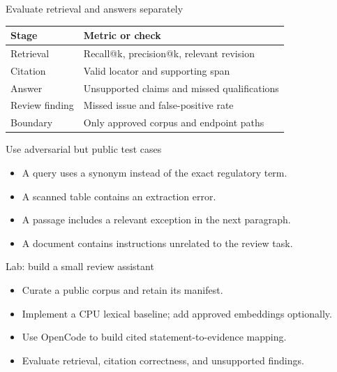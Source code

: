 \documentclass[aspectratio=169,11pt]{beamer}
\begin{document}
\begin{frame}[t,fragile]{Evaluate retrieval and answers separately}
\fontsize{10.5}{12.5}\selectfont\setlength{\tabcolsep}{4pt}\renewcommand{\arraystretch}{1.15}
\begin{tabular}{>{\raggedright\arraybackslash}p{}>{\raggedright\arraybackslash}p{}}
\toprule
\textbf{Stage} & \textbf{Metric or check} \\ \midrule
Retrieval & Recall@k, precision@k, relevant revision \\[2pt]
Citation & Valid locator and supporting span \\[2pt]
Answer & Unsupported claims and missed qualifications \\[2pt]
Review finding & Missed issue and false-positive rate \\[2pt]
Boundary & Only approved corpus and endpoint paths \\[2pt]
\bottomrule\end{tabular}\par\vspace{2mm}
\end{frame}
\begin{frame}[t,fragile]{Use adversarial but public test cases}
\fontsize{11.5}{14}\selectfont
\begin{itemize}\setlength{\itemsep}{2mm}
\item A query uses a synonym instead of the exact regulatory term.
\item A scanned table contains an extraction error.
\item A passage includes a relevant exception in the next paragraph.
\item A document contains instructions unrelated to the review task.
\end{itemize}
\end{frame}
\begin{frame}[t,fragile]{Lab: build a small review assistant}
\fontsize{11.5}{14}\selectfont
\begin{itemize}\setlength{\itemsep}{2mm}
\item Curate a public corpus and retain its manifest.
\item Implement a CPU lexical baseline; add approved embeddings optionally.
\item Use OpenCode to build cited statement-to-evidence mapping.
\item Evaluate retrieval, citation correctness, and unsupported findings.
\end{itemize}
\end{frame}
\end{document}
